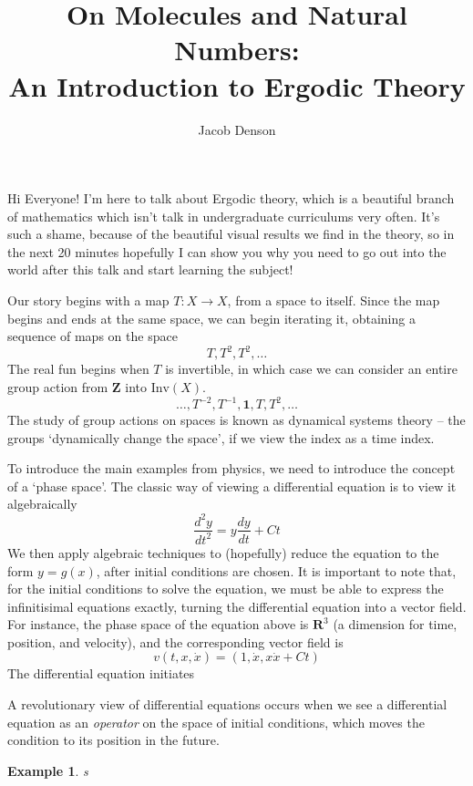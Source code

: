 \documentclass[12pt]{report}
\title{On Molecules and Natural Numbers:\\
An Introduction to Ergodic Theory}
\author{Jacob Denson}
\theoremstyle{plain}
\newtheorem*{example}{Example}
\theoremstyle{definition}
\begin{document}

\maketitle



Hi Everyone! I'm here to talk about Ergodic theory, which is a beautiful branch of mathematics which isn't talk in undergraduate curriculums very often. It's such a shame, because of the beautiful visual results we find in the theory, so in the next 20 minutes hopefully I can show you why you need to go out into the world after this talk and start learning the subject!

Our story begins with a map $T:X \to X$, from a space to itself. Since the map begins and ends at the same space, we can begin iterating it, obtaining a sequence of maps on the space
%
\[ T, T^2, T^2, \dots \]
%
The real fun begins when $T$ is invertible, in which case we can consider an entire group action from $\mathbf{Z}$ into $\text{Inv}(X)$.
%
\[ \dots, T^{-2}, T^{-1}, \mathbf{1}, T, T^2, \dots \]
%
The study of group actions on spaces is known as dynamical systems theory -- the groups `dynamically change the space', if we view the index as a time index.

To introduce the main examples from physics, we need to introduce the concept of a `phase space'. The classic way of viewing a differential equation is to view it algebraically
%
\[ \frac{d^2y}{dt^2} = y \frac{dy}{dt} + C t \]
%
We then apply algebraic techniques to (hopefully) reduce the equation to the form $y = g(x)$, after initial conditions are chosen. It is important to note that, for the initial conditions to solve the equation, we must be able to express the infinitisimal equations exactly, turning the differential equation into a vector field. For instance, the phase space of the equation above is $\mathbf{R}^3$ (a dimension for time, position, and velocity), and the corresponding vector field is
%
\[ v(t,x,\dot{x}) = (1, \dot{x}, x \dot{x} + C t) \]
%
The differential equation initiates


A revolutionary view of differential equations occurs when we see a differential equation as an {\it operator} on the space of initial conditions, which moves the condition to its position in the future.

\begin{example}
    s
\end{example}
\end{document}
